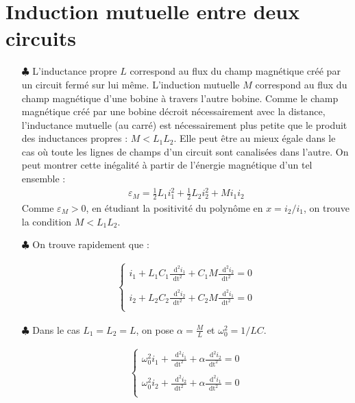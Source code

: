 \documentclass{report}
\newcommand*\dif{\mathop{}\!\mathrm{d}}
\begin{document}
\section*{Induction mutuelle entre deux circuits}

\begin{itemize}

	\item[$\clubsuit$] L'inductance propre $L$ correspond au flux du champ magnétique créé par un circuit fermé sur lui même. L'induction mutuelle $M$ correspond au flux du champ magnétique d'une bobine à travers l'autre bobine. Comme le champ magnétique créé par une bobine décroit nécessairement avec la distance, l'inductance mutuelle (au carré) est nécessairement plus petite que le produit des inductances propres : $M<L_1L_2$. Elle peut être au mieux égale dans le cas où toute les lignes de champs d'un circuit sont canalisées dans l'autre. On peut montrer cette inégalité à partir de l'énergie magnétique d'un tel ensemble : 
	\begin{align*}
		\varepsilon_M=\frac{1}{2}L_1i_1^2+\frac{1}{2}L_2i_2^2+Mi_1i_2
	\end{align*}
	Comme $\varepsilon_M>0$, en étudiant la positivité du polynôme en $x=i_2/i_1$, on trouve la condition $M<L_1L_2$.
	
	\item[$\clubsuit$] On trouve rapidement que :
	
	\begin{align*}
	\left\lbrace
	\begin{array}{ccc}
	i_1 + L_1C_1\frac{\dif^2 i_1}{\mathrm{dt}^2}+C_1M\frac{\dif^2 i_2}{\mathrm{dt}^2}=0\\
	\\
	i_2 + L_2C_2\frac{\dif^2 i_2}{\mathrm{dt}^2}+C_2M\frac{\dif^2 i_1}{\mathrm{dt}^2}=0\\
	\end{array}\right.
	\end{align*}		
	
	\item[$\clubsuit$] Dans le cas $L_1=L_2=L$, on pose $\alpha=\frac{M}{L}$ et $\omega_0^2=1/LC$.
	
	\begin{align*}
	\left\lbrace
	\begin{array}{ccc}
	\omega_0^2i_1+\frac{\dif^2 i_1}{\mathrm{dt}^2}+\alpha\frac{\dif^2 i_2}{\mathrm{dt}^2}=0\\
	\\
	\omega_0^2i_2+\frac{\dif^2 i_2}{\mathrm{dt}^2}+\alpha\frac{\dif^2 i_1}{\mathrm{dt}^2}=0\\
	\end{array}\right.
	\end{align*}		
	

\end{itemize}
\end{document}
